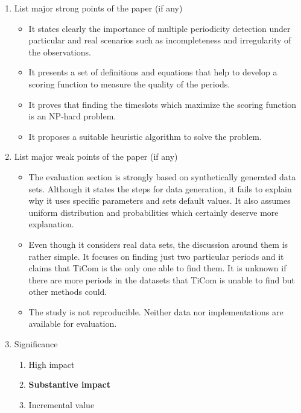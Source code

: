 \documentclass{article}
\begin{document}
\begin{enumerate}
 \item List major strong points of the paper (if any) \\ 
 \begin{framed}
  \begin{itemize}
    \item It states clearly the importance of multiple periodicity detection under particular and real scenarios such as incompleteness and irregularity of the observations.
    \item It presents a set of definitions and equations that help to develop a scoring function to measure the quality of the periods.
    \item It proves that finding the timeslots which maximize the scoring function is an NP-hard problem.
    \item It proposes a suitable heuristic algorithm to solve the problem. 
  \end{itemize}
 \end{framed}
 
 \item List major weak points of the paper (if any) \\ 
 \begin{framed}
  \begin{itemize}
    \item The evaluation section is strongly based on synthetically generated data sets. Although it states the steps for data generation, it fails to explain why it uses specific parameters and sets default values.  It also assumes uniform distribution and probabilities which certainly deserve more explanation.
    \item Even though it considers real data sets, the discussion around them is rather simple. It focuses on finding just two particular periods and it claims that TiCom is the only one able to find them.  It is unknown if there are more periods in the datasets that TiCom is unable to find but other methods could.
    \item The study is not reproducible. Neither data nor implementations are available for evaluation.
  \end{itemize}
 \end{framed}

 \item Significance
 \begin{enumerate}[I]
  \item High impact
  \item \textbf{Substantive impact}
  \item Incremental value
 \end{enumerate} 
 

\end{enumerate}
\end{document}

